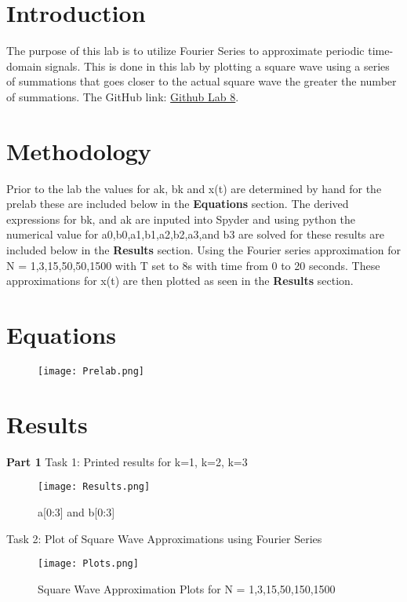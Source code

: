 \documentclass[12pt]{report}
\begin{document}
\section{Introduction}
The purpose of this lab is to utilize Fourier Series to approximate periodic time-domain signals. This is done in this lab by plotting a square wave using a series of summations that goes closer to the actual square wave the greater the number of summations. 
\newline \newline The GitHub link: \href{https://github.com/CDJohnson279}{Github Lab 8}. 

\section{Methodology}
Prior to the lab  the values for ak, bk and x(t) are determined by hand for the prelab these are included below in the \textbf{Equations} section. The derived expressions for bk, and ak are inputed into Spyder and using python the numerical value for a0,b0,a1,b1,a2,b2,a3,and b3 are solved for these results are included below in the \textbf{Results} section. Using the Fourier series approximation for N = {1,3,15,50,50,1500} with T set to 8s with time from 0 to 20 seconds. These approximations for x(t) are then plotted as seen in the \textbf{Results} section.  

\section{Equations}

\begin{figure}[htp]
    \texttt{[image: Prelab.png]}
    \label{fig:Prelab Equations.png}
\end{figure}\newline


\newpage

\section{Results}
\textbf{Part 1}\newline
Task 1: Printed results for k=1, k=2, k=3
\begin{figure}[htp]
    \centering
    \texttt{[image: Results.png]}
    \caption{a[0:3] and b[0:3]}
    \label{fig:results Equations.png}
\end{figure}
\newpage
Task 2: Plot of Square Wave Approximations using Fourier Series
\begin{figure}[htp]
    \centering
    \texttt{[image: Plots.png]}
    \caption{Square Wave Approximation Plots for N = {1,3,15,50,150,1500}}
    \label{fig:results Equations.png}
\end{figure}
\newpage
\end{document}
